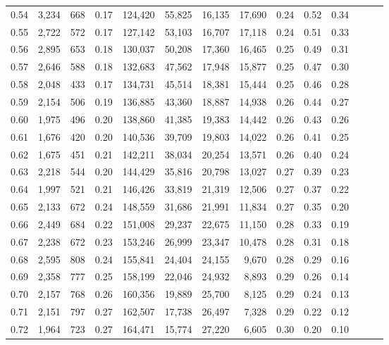 \begin{tabular}{rrrrrrrrrrrrrr}
0.54 &  3,234 &  668 &  0.17 &  124,420 &   55,825 &  16,135 &  17,690 &  0.24 &  0.52 &      0.34 \\
0.55 &  2,722 &  572 &  0.17 &  127,142 &   53,103 &  16,707 &  17,118 &  0.24 &  0.51 &      0.33 \\
0.56 &  2,895 &  653 &  0.18 &  130,037 &   50,208 &  17,360 &  16,465 &  0.25 &  0.49 &      0.31 \\
0.57 &  2,646 &  588 &  0.18 &  132,683 &   47,562 &  17,948 &  15,877 &  0.25 &  0.47 &      0.30 \\
0.58 &  2,048 &  433 &  0.17 &  134,731 &   45,514 &  18,381 &  15,444 &  0.25 &  0.46 &      0.28 \\
0.59 &  2,154 &  506 &  0.19 &  136,885 &   43,360 &  18,887 &  14,938 &  0.26 &  0.44 &      0.27 \\
0.60 &  1,975 &  496 &  0.20 &  138,860 &   41,385 &  19,383 &  14,442 &  0.26 &  0.43 &      0.26 \\
0.61 &  1,676 &  420 &  0.20 &  140,536 &   39,709 &  19,803 &  14,022 &  0.26 &  0.41 &      0.25 \\
0.62 &  1,675 &  451 &  0.21 &  142,211 &   38,034 &  20,254 &  13,571 &  0.26 &  0.40 &      0.24 \\
0.63 &  2,218 &  544 &  0.20 &  144,429 &   35,816 &  20,798 &  13,027 &  0.27 &  0.39 &      0.23 \\
0.64 &  1,997 &  521 &  0.21 &  146,426 &   33,819 &  21,319 &  12,506 &  0.27 &  0.37 &      0.22 \\
0.65 &  2,133 &  672 &  0.24 &  148,559 &   31,686 &  21,991 &  11,834 &  0.27 &  0.35 &      0.20 \\
0.66 &  2,449 &  684 &  0.22 &  151,008 &   29,237 &  22,675 &  11,150 &  0.28 &  0.33 &      0.19 \\
0.67 &  2,238 &  672 &  0.23 &  153,246 &   26,999 &  23,347 &  10,478 &  0.28 &  0.31 &      0.18 \\
0.68 &  2,595 &  808 &  0.24 &  155,841 &   24,404 &  24,155 &   9,670 &  0.28 &  0.29 &      0.16 \\
0.69 &  2,358 &  777 &  0.25 &  158,199 &   22,046 &  24,932 &   8,893 &  0.29 &  0.26 &      0.14 \\
0.70 &  2,157 &  768 &  0.26 &  160,356 &   19,889 &  25,700 &   8,125 &  0.29 &  0.24 &      0.13 \\
0.71 &  2,151 &  797 &  0.27 &  162,507 &   17,738 &  26,497 &   7,328 &  0.29 &  0.22 &      0.12 \\
0.72 &  1,964 &  723 &  0.27 &  164,471 &   15,774 &  27,220 &   6,605 &  0.30 &  0.20 &      0.10 \\

\end{tabular}
